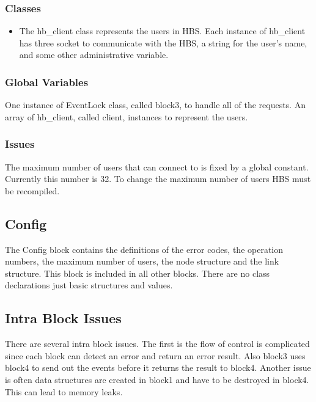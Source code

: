 \subsubsection*{Classes}
\begin{itemize}
  \item The hb\_client class represents the users in HBS.  Each instance of
  hb\_client has three socket to communicate with the HBS, a string for the
  user's name, and some other administrative variable.

\end{itemize}

\subsubsection*{Global Variables}

One instance of EventLock class, called block3, to handle all of the
requests.  An array of hb\_client, called client, instances to represent the users.

\subsubsection*{Issues}

The maximum number of users that can connect to is fixed by a global
constant.  Currently this number is 32.  To change the maximum number of
users HBS must be recompiled.

\subsection{Config}

The Config block contains the definitions of the error codes, the operation
numbers, the maximum number of users, the node structure and the link
structure.  This block is included in all other blocks.  There are no class
declarations just basic structures and values.

\subsection{Intra Block Issues}

There are several intra block issues.  The first is the flow of control is
complicated since each block can detect an error and return an error
result.  Also block3 uses block4 to send out the events before it returns
the result to block4.  Another issue is often data structures are
created in block1 and have to be destroyed in block4.  This can lead to
memory leaks.
